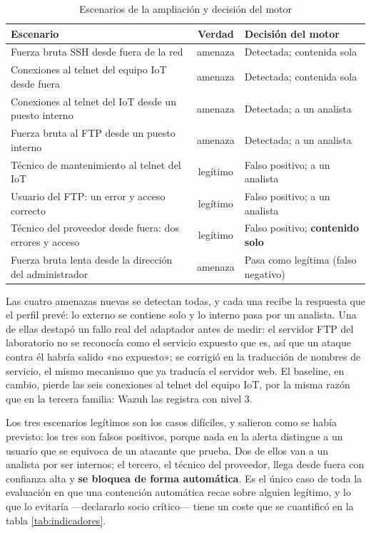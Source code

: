 \begin{table}[H]
  \centering
  \caption{Escenarios de la ampliación y decisión del motor}
  \label{tab:ampliacion}
  \begin{tabular}{@{}p{}cp{}@{}}
    \toprule
    \textbf{Escenario} & \textbf{Verdad} & \textbf{Decisión del motor} \\
    \midrule
    Fuerza bruta SSH desde fuera de la red & amenaza & Detectada; contenida sola \\
    Conexiones al telnet del equipo IoT desde fuera & amenaza & Detectada; contenida sola \\
    Conexiones al telnet del IoT desde un puesto interno & amenaza & Detectada; a un analista \\
    Fuerza bruta al FTP desde un puesto interno & amenaza & Detectada; a un analista \\
    Técnico de mantenimiento al telnet del IoT & legítimo & Falso positivo; a un analista \\
    Usuario del FTP: un error y acceso correcto & legítimo & Falso positivo; a un analista \\
    Técnico del proveedor desde fuera: dos errores y acceso & legítimo & Falso positivo;
      \textbf{contenido solo} \\
    Fuerza bruta lenta desde la dirección del administrador & amenaza & Pasa como legítima
      (falso negativo) \\
    \bottomrule
  \end{tabular}
\end{table}

Las cuatro amenazas nuevas se detectan todas, y cada una recibe la respuesta que el perfil prevé: lo
externo se contiene solo y lo interno pasa por un analista. Una de ellas destapó un fallo real del
adaptador antes de medir: el servidor FTP del laboratorio no se reconocía como el servicio expuesto
que es, así que un ataque contra él habría salido «no expuesto»; se corrigió en la traducción de
nombres de servicio, el mismo mecanismo que ya traducía el servidor web. El baseline, en cambio,
pierde las seis conexiones al telnet del equipo IoT, por la misma razón que en la tercera familia:
Wazuh las registra con nivel 3.

Los tres escenarios legítimos son los casos difíciles, y salieron como se había previsto: los tres
son falsos positivos, porque nada en la alerta distingue a un usuario que se equivoca de un atacante
que prueba. Dos de ellos van a un analista por ser internos; el tercero, el técnico del proveedor,
llega desde fuera con confianza alta y \textbf{se bloquea de forma automática}. Es el único caso de
toda la evaluación en que una contención automática recae sobre alguien legítimo, y lo que lo
evitaría ---declararlo socio crítico--- tiene un coste que se cuantificó en la tabla
\ref{tab:indicadores}.


